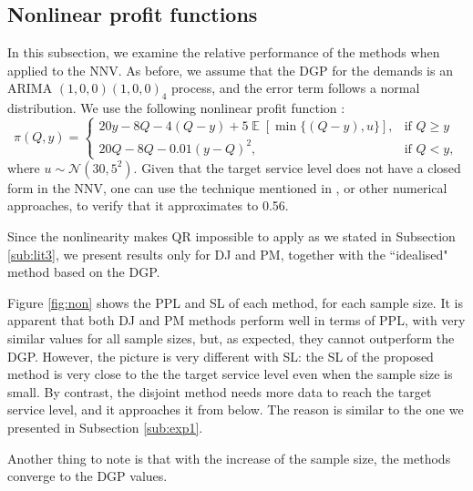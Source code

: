 \documentclass{article}
\DeclareMathOperator{\E}{\mathbb{E}}
\begin{document}
\subsection{Nonlinear profit functions} \label{sub:exp2}

In this subsection, we examine the relative performance of the methods when applied to the NNV. As before, we assume that the DGP for the demands is an ARIMA $(1,0,0)(1,0,0)_4$ process, and the error term follows a normal distribution. We use the following nonlinear profit function \cite{KK18}:
\[
    \pi(Q,y)=
    \begin{cases}
        20y-8Q-4(Q-y)+5\E[\min \{(Q-y),u\}],& \text{if } Q\geq y\\
        20Q-8Q-0.01(y-Q)^2,& \text{if } Q< y,
    \end{cases}
\]
where $u\sim \mathcal{N}(30,5^2)$. Given that the target service level does not have a closed form in the NNV, one can use the technique mentioned in \cite{KK18}, or other numerical approaches, to verify that it approximates to 0.56.

Since the nonlinearity makes QR impossible to apply as we stated in Subsection \ref{sub:lit3}, we present results only for DJ and PM, together with the ``idealised" method based on the DGP.

Figure \ref{fig:non} shows the PPL and SL of each method, for each sample size. It is apparent that both DJ and PM methods perform well in terms of PPL, with very similar values for all sample sizes, but, as expected, they cannot outperform the DGP. However, the picture is very different with SL: the SL of the proposed method is very close to the the target service level even when the sample size is small. By contrast, the disjoint method needs more data to reach the target service level, and it approaches it from below. The reason is similar to the one we presented in Subsection \ref{sub:exp1}. 

Another thing to note is that with the increase of the sample size, the methods converge to the DGP values.
\end{document}
